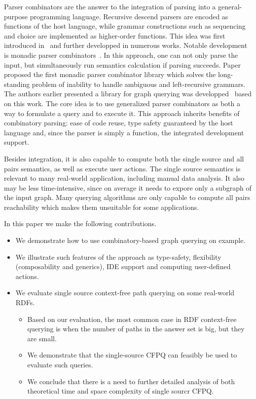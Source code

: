 Parser combinators are the answer to the integration of parsing into a general-purpose programming language.
Recursive descend parsers are encoded as functions of the host language, while grammar constructions such as sequencing and choice are implemented as higher-order functions. 
This idea was first introduced in~\cite{burge} and further developped in numerous works. 
Notable development is monadic parser combinators~\cite{hutton1996monadic}. 
In this approach, one can not only parse the input, but simultaneously run semantics calculation if parsing succeeds.
Paper~\cite{izmaylova2016practical} proposed the first monadic parser combinator library which solves the long-standing problem of inability to handle ambiguous and left-recursive grammars. 
The authors earlier presented a library for graph querying was developped~\cite{10.1145/3241653.3241655} based on this work. 
The core idea is to use generalized parser combinators as both a way to formulate a query and to execute it. 
This approach inherits benefits of combinatory parsing: ease of code reuse, type safety guaranteed by the host language and, since the parser is simply a function, the integrated development support. 

Besides integration, it is also capable to compute both the single source and all pairs semantics, as well as execute user actions.
The single source semantics is relevant to many real-world application, including manual data analysis. 
It also may be less time-intensive, since on average it needs to expore only a subgraph of the input graph. 
Many querying algorithms are only capable to compute all pairs reachability which makes them unsuitable for some applications. 

In this paper we make the following contributions.
\begin{itemize}
  \item We demonstrate how to use combinatory-based graph querying on example. 
  \item We illustrate such features of the approach as type-safety, flexibility (composability and generics), IDE support and computing user-defined actions.
  \item We evaluate single source context-free path querying on some real-world RDFs.
  \begin{itemize}
    \item Based on our evaluation, the most common case in RDF context-free querying is when the number of paths in the answer set is big, but they are small.  
    \item We demonstrate that the single-source CFPQ can feasibly be used to evaluate such queries. 
    \item We conclude that there is a need to further detailed analysis of both theoretical time and space complexity of single sourcr CFPQ.
  \end{itemize}
\end{itemize}
